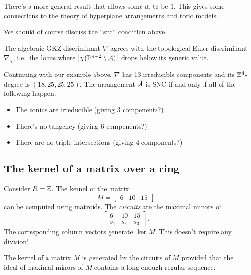 \documentclass{article}
\begin{document}
There's a more general result that allows some $d_i$ to be $1$.
This gives some connections to the theory of hyperplane arrangements and toric models.

We should of course discuss the ``snc'' condition above.

\begin{thm}
	The algebraic GKZ discriminant $\nabla$ agrees with the topological Euler discriminant $\nabla_\chi$, i.e.\ the locus where $\left|{\chi(\mathbb{P}^{n-2} \setminus \mathcal{A})}\right|$ drops below its generic value.
\end{thm}

\begin{ex}
	Continuing with our example above, $\nabla$ has 13 irreducible components and its $\mathbb{Z}^4$-degree is $(18, 25, 25, 25)$.
	The arrangement $\mathcal{A}$ is SNC if and only if all of the following happen:
	\begin{itemize}
		\item The conics are irreducible (giving 3 components?)
		\item There's no tangency (giving 6 components?)
		\item There are no triple intersections (giving 4 components?)
	\end{itemize}
\end{ex}

\subsection{The kernel of a matrix over a ring}

\begin{ex}
	Consider $R = \mathbb{Z}$.
	The kernel of the matrix
	\[
		M = \begin{bmatrix}
			6 & 10 & 15
		\end{bmatrix}
	\]
	can be computed using matroids.
	The \emph{circuits} are the maximal minors of
	\[	
		\begin{bmatrix}
			6 & 10 & 15 \\
			s_1 & s_2 & s_3
		\end{bmatrix}.
	\]
	The corresponding column vectors generate $\ker M$.
	This doesn't require any division!
\end{ex}

\begin{prop}
	The kernel of a matrix $M$ is generated by the circuits of $M$ provided that the ideal of maximal minors of $M$ contains a long enough regular sequence.
\end{prop}
\end{document}
